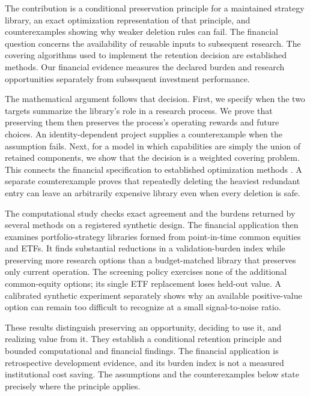 The contribution is a conditional preservation principle for a maintained
strategy library, an exact optimization representation of that principle, and
counterexamples showing why weaker deletion rules can fail. The financial
question concerns the availability of reusable inputs to subsequent research.
The covering algorithms used to implement the retention decision are
established methods. Our financial evidence measures the declared burden and
research opportunities separately from subsequent investment performance.

The mathematical argument follows that decision. First, we specify when the
two targets summarize the library's role in a research process. We prove that
preserving them then preserves the process's operating rewards and future
choices. An identity-dependent project supplies a counterexample when the
assumption fails. Next, for a model in which capabilities are simply the union
of retained components, we show that the decision is a weighted covering
problem. This connects the financial specification to established optimization
methods \citep{Karp1972,Chvatal1979}. A separate counterexample proves that
repeatedly deleting the heaviest redundant entry can leave an arbitrarily
expensive library even when every deletion is safe.

The computational study checks exact agreement and the burdens returned by
several methods on a registered synthetic design. The financial application
then examines portfolio-strategy libraries formed from point-in-time common
equities and ETFs. It finds substantial reductions in a validation-burden
index while preserving more research options than a budget-matched library
that preserves only current operation. The screening policy exercises none of
the additional common-equity options; its single ETF replacement loses
held-out value. A calibrated synthetic experiment separately shows why an
available positive-value option can remain too difficult to recognize at a
small signal-to-noise ratio.

These results distinguish preserving an opportunity, deciding to use it, and
realizing value from it. They establish a conditional retention principle and
bounded computational and financial findings. The financial application is
retrospective development evidence, and its burden index is not a measured
institutional cost saving. The assumptions and the counterexamples below
state precisely where the principle applies.
